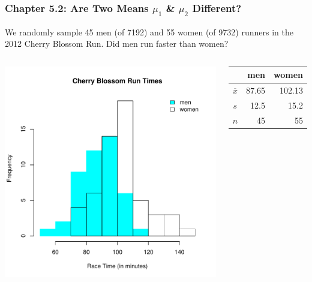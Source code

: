 \documentclass[handout]{beamer}
\newcommand{\blue}[1]{\textcolor{blue2}{#1}}
\begin{document}
%
%
\begin{frame}[fragile]
\frametitle{Chapter 5.2: Are Two Means $\mu_1$ \& $\mu_2$ Different?}

We randomly sample 45 men (of 7192) and 55 women (of 9732) runners in the 2012 Cherry Blossom Run. \pause \blue{Did men run faster than women?}

\begin{columns}
\pause{}
\begin{center}
\includegraphics[width=\textwidth]{figure/race.pdf}
\end{center}
\pause{}
\begin{center}
\begin{tabular}{c|rr}
     & men & women \\ 
\hline
    $\overline{x}$ & 87.65 & 102.13 \\ 
    $s$ & 12.5 & 15.2 \\ 
    $n$ & 45 & 55 \\ 
\end{tabular}
\end{center}
\end{columns}

\end{frame}
\end{document}
